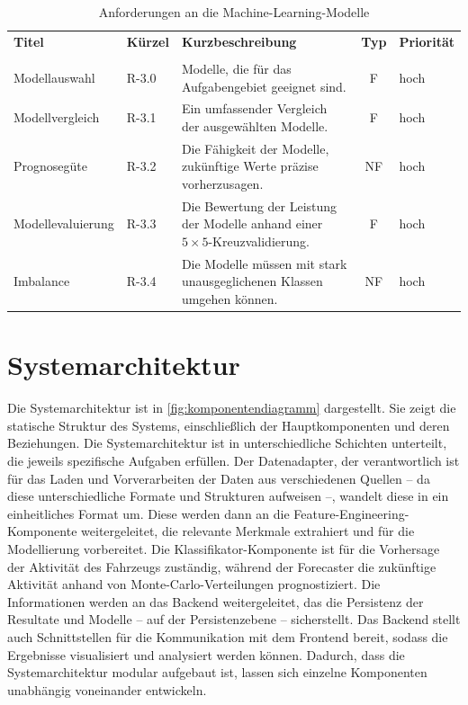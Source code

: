 \begin{landscape}
\newpage
\querkopf

\begin{table}[H]
    \centering
    \caption{Anforderungen an die Machine-Learning-Modelle}
    \label{tab:anforderungen-ml}
    \begin{tabularx}{\linewidth}{|l|l|X|c|l|}
        \hline
        \textbf{Titel} & \textbf{Kürzel} & \textbf{Kurzbeschreibung} & \textbf{Typ} & \textbf{Priorität} \\
        \Xhline{1pt}
        \multicolumn{5}{|l|}{\textbf{Machine-Learning-Modelle}} \\
        \Xhline{1pt}
        Modell\-auswahl   & R-3.0 & Modelle, die für das Aufgabengebiet geeignet sind. & F & hoch   \\
        \hline
        Modell\-vergleich & R-3.1 & Ein umfassender Vergleich der ausgewählten Modelle. & F & hoch \\
        \hline
        Prognosegüte & R-3.2 & Die Fähigkeit der Modelle, zukünftige Werte präzise vorherzusagen. & NF & hoch \\
        \hline
        Modell\-evaluierung & R-3.3 & Die Bewertung der Leistung der Modelle anhand einer $5\times5$-Kreuzvalidierung. & F & hoch \\
        \hline
        Imbalance & R-3.4 & Die Modelle müssen mit stark unausgeglichenen Klassen umgehen können. & NF & hoch \\
        \hline
    \end{tabularx}
\end{table}
\end{landscape}

\section{Systemarchitektur}
\label{sec:systemarchitektur}

Die Systemarchitektur ist in \cref{fig:komponentendiagramm} dargestellt. Sie zeigt die statische Struktur des Systems, einschließlich der Hauptkomponenten und deren Beziehungen. Die Systemarchitektur ist in unterschiedliche Schichten unterteilt, die jeweils spezifische Aufgaben erfüllen. Der Datenadapter, der verantwortlich ist für das Laden und Vorverarbeiten der Daten aus verschiedenen Quellen -- da diese unterschiedliche Formate und Strukturen aufweisen --, wandelt diese in ein einheitliches Format um. Diese werden dann an die Feature-Engineering-Komponente weitergeleitet, die relevante Merkmale extrahiert und für die Modellierung vorbereitet. Die Klassifikator-Komponente ist für die Vorhersage der Aktivität des Fahrzeugs zuständig, während der Forecaster die zukünftige Aktivität anhand von Monte-Carlo-Verteilungen prognostiziert. Die Informationen werden an das Backend weitergeleitet, das die Persistenz der Resultate und Modelle -- auf der Persistenzebene -- sicherstellt. Das Backend stellt auch Schnittstellen für die Kommunikation mit dem Frontend bereit, sodass die Ergebnisse visualisiert und analysiert werden können. Dadurch, dass die Systemarchitektur modular aufgebaut ist, lassen sich einzelne Komponenten unabhängig voneinander entwickeln.

